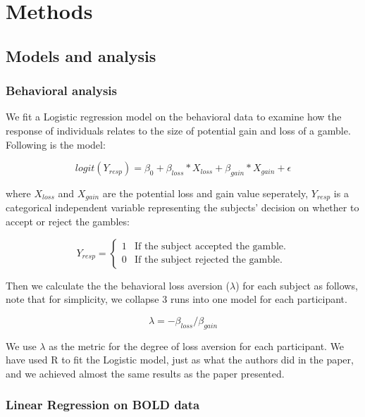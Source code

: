 \section{Methods}

\subsection{Models and analysis}

\subsubsection{Behavioral analysis}

We fit a Logistic regression model on the behavioral data to examine how the response of individuals relates to the size of potential gain and loss of a gamble. Following is the model:

\begin{equation}
logit(Y_{resp}) = \beta_0 + \beta_{loss} *X_{loss} + \beta_{gain} * X_{gain}  + \epsilon
\end{equation}

where $X_{loss}$ and $X_{gain}$ are the potential loss and gain value seperately, $Y_{resp}$ is a categorical independent variable representing the subjects' decision on whether to accept or reject the gambles:

\begin{displaymath}
Y_{resp} = \left \{ \begin{array}{ll}
1 & \textrm{If the subject accepted the gamble.} \\
0 & \textrm{If the subject rejected the gamble.}
\end{array} \right .
\end{displaymath}

Then we calculate the the behavioral loss aversion ($ \lambda $) for each subject as follows, note that for simplicity, we collapse 3 runs into one model for each participant.

\begin{equation}
\lambda = -\beta_{loss} / \beta_{gain}
\end{equation}

We use $\lambda$ as the metric for the degree of loss aversion for each participant. We have used R to fit the Logistic model, just as what the authors did in the paper, and we achieved almost the same results as the paper presented.

\subsubsection{Linear Regression on BOLD data}

